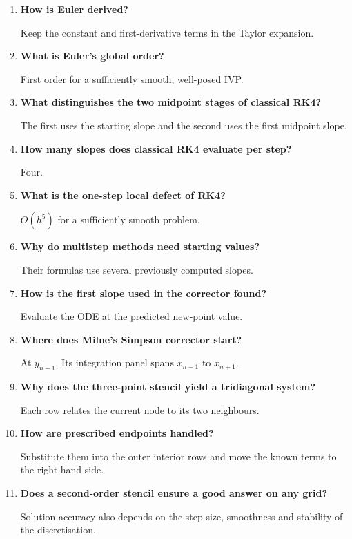 \documentclass[12pt,a4paper]{article}
\newcommand{\Q}[1]{\textbf{#1}\par\noindent\ignorespaces}
\begin{document}
\begin{tcolorbox}[exambox, title={Frequently Asked / Viva Questions}]
\begin{enumerate}[topsep=0pt, label=\textbf{Q\arabic*.}, itemsep=5pt, leftmargin=*]
  \item \Q{How is Euler derived?}
    Keep the constant and first-derivative terms in the Taylor expansion.
  \item \Q{What is Euler's global order?}
    First order for a sufficiently smooth, well-posed IVP.
  \item \Q{What distinguishes the two midpoint stages of classical RK4?}
    The first uses the starting slope and the second uses the first midpoint slope.
  \item \Q{How many slopes does classical RK4 evaluate per step?}
    Four.
  \item \Q{What is the one-step local defect of RK4?}
    $O(h^5)$ for a sufficiently smooth problem.
  \item \Q{Why do multistep methods need starting values?}
    Their formulas use several previously computed slopes.
  \item \Q{How is the first slope used in the corrector found?}
    Evaluate the ODE at the predicted new-point value.
  \item \Q{Where does Milne's Simpson corrector start?}
    At $y_{n-1}$. Its integration panel spans $x_{n-1}$ to $x_{n+1}$.
  \item \Q{Why does the three-point stencil yield a tridiagonal system?}
    Each row relates the current node to its two neighbours.
  \item \Q{How are prescribed endpoints handled?}
    Substitute them into the outer interior rows and move the known terms to the right-hand side.
  \item \Q{Does a second-order stencil ensure a good answer on any grid?}
    Solution accuracy also depends on the step size, smoothness and stability of the discretisation.
\end{enumerate}
\end{tcolorbox}
\end{document}
